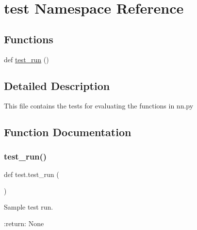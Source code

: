 \hypertarget{namespacetest}{}\section{test Namespace Reference}
\label{namespacetest}
\subsection*{Functions}
\begin{DoxyCompactItemize}
\item 
def \hyperlink{namespacetest_ae33228479f5f6d2957b7e3b5177e1328}{test\+\_\+run} ()
\end{DoxyCompactItemize}


\subsection{Detailed Description}
\begin{DoxyVerb}This file contains the tests for evaluating the functions in nn.py
\end{DoxyVerb}
 

\subsection{Function Documentation}
\mbox{\label{namespacetest_ae33228479f5f6d2957b7e3b5177e1328}} 
\subsubsection{\texorpdfstring{test\+\_\+run()}{test\_run()}}
{\footnotesize\ttfamily def test.\+test\+\_\+run (\begin{DoxyParamCaption}{ }\end{DoxyParamCaption})}

\begin{DoxyVerb}Sample test run.

:return: None
\end{DoxyVerb}
 